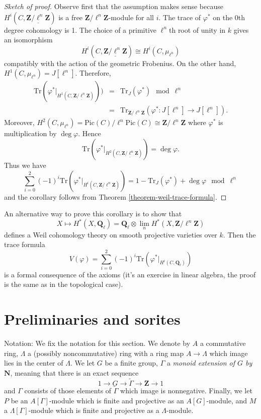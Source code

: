 \begin{proof}[Sketch of proof]
Observe first that the assumption makes sense because $H^i(C,
\underline{\mathbf{Z}/\ell^n \mathbf{Z}})$ is a free $\mathbf{Z}/\ell^n
\mathbf{Z}$-module for all $i$. The trace of $\varphi^*$ on the 0th degree
cohomology is 1. The choice of a primitive $\ell^n$th root of unity in $k$
gives an isomorphism
$$
H^i(C, \underline{\mathbf{Z}/\ell^n \mathbf{Z}}) \cong H^i(C, \mu_{\ell^n})
$$
compatibly with the action of the geometric Frobenius. On the other hand,
$H^1(C, \mu_{\ell^n}) = J[\ell^n]$. Therefore,
\begin{eqnarray*}
\text{Tr}(\varphi^* |_{H^1 (C, \underline{\mathbf{Z}/\ell^n \mathbf{Z}})})) & =
& \text{Tr}_J (\varphi^*) \mod \ell^n \\
& = & \text{Tr}_{\mathbf{Z}/\ell^n \mathbf{Z}} (\varphi^* : J[\ell^n] \to
J[\ell^n]).
\end{eqnarray*}
Moreover, $H^2(C, \mu_{\ell^n}) = \text{Pic}(C)/\ell^n\text{Pic}(C) \cong
\mathbf{Z}/\ell^n \mathbf{Z}$ where $\varphi^*$ is multiplication by $\deg
\varphi$. Hence
$$
\text{Tr} (\varphi^*|_{H^2 (C, \underline{\mathbf{Z}/\ell^n \mathbf{Z}})}) =
\deg \varphi.
$$
Thus we have
$$
\sum_{i = 0}^2 (-1)^i
\text{Tr}(\varphi^* |_{H^i (C, \underline{\mathbf{Z}/\ell^n \mathbf{Z}})}) =
1 - \text{Tr}_J(\varphi^*) + \deg \varphi \mod \ell^n
$$
and the corollary follows from Theorem \ref{theorem-weil-trace-formula}.
\end{proof}

\noindent
An alternative way to prove this corollary is to show that
$$
X \mapsto H^* (X, \mathbf{Q}_\ell) =
\mathbf{Q}_\ell \otimes
\lim_n H^*(X, \mathbf{Z}/\ell^n\mathbf{Z})
$$
defines a Weil cohomology theory on smooth projective varieties over $k$. Then
the trace formula
$$
V(\varphi) = \sum_{i = 0}^2 (-1)^i
\text{Tr}(\varphi^* |_{H^i(C, \mathbf{Q}_\ell)})
$$
is a formal consequence of the axioms (it's an exercise in linear algebra, the
proof is the same as in the topological case).




\section{Preliminaries and sorites}
\label{section-preliminaries}

\noindent
Notation:
We fix the notation for this section. We denote by $A$ a commutative ring,
$\Lambda$ a (possibly noncommutative) ring with a ring map $A\to \Lambda$ which
image lies in the center of $\Lambda$. We let $G$ be a finite group, $\Gamma$ a
{\it monoid extension of $G$ by $\mathbf{N}$}, meaning that there is an exact
sequence
$$
1\to G\to \tilde\Gamma\to \mathbf{Z}\to 1
$$
and $\Gamma$ consists of those elements of $\tilde\Gamma$ which image is
nonnegative. Finally, we let $P$ be an $A[\Gamma]$-module which is finite and
projective as an $A[G]$-module, and $M$ a $\Lambda[\Gamma]$-module which is
finite and projective as a $\Lambda$-module.

